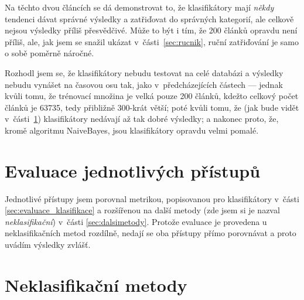 \documentclass[12pt,a4paper]{report}
\begin{document}
Na těchto dvou článcích se dá demonstrovat to, že klasifikátory mají \emph{někdy} tendenci dávat správné výsledky a zatřiďovat do správných kategorií, ale celkově nejsou výsledky příliš přesvědčivé. Může to být i tím, že 200 článků opravdu není příliš, ale, jak jsem se snažil ukázat v~části~\ref{sec:rucnik}, ruční zatřiďování je samo o sobě poměrně náročné.


Rozhodl jsem se, že klasifikátory nebudu testovat na celé databázi a výsledky nebudu vynášet na časovou osu tak, jako v~předcházejících částech --- jednak kvůli tomu, že trénovací množina je velká pouze 200 článků, kdežto celkový počet článků je 63735, tedy přibližně 300-krát větší; poté kvůli tomu, že (jak bude vidět v~části~\ref{sec:evaluace_jedn_prist}) klasifikátory nedávají až tak dobré výsledky; a nakonec proto, že, kromě algoritmu NaiveBayes, jsou klasifikátory opravdu velmi pomalé.

\section{Evaluace jednotlivých přístupů}

\label{sec:evaluace_jedn_prist}

Jednotlivé přístupy jsem porovnal metrikou, popisovanou pro klasifikátory v~části \ref{sec:evaluace_klasifikace} a rozšířenou na další metody (zde jsem si je nazval \emph{neklasifikační}) v~části \ref{sec:dalsimetody}. Protože evaluace je provedena u neklasifikačních metod rozdílně, nedají se oba přístupy přímo porovnávat a proto uvádím výsledky zvlášť.



\section{Neklasifikační metody}

\end{document}
